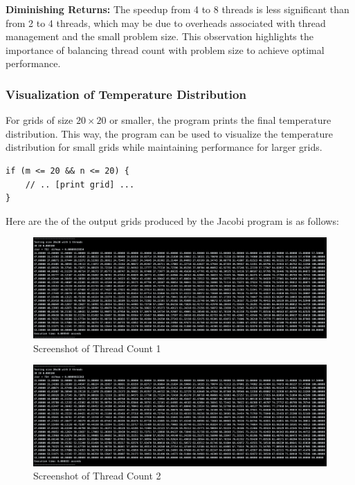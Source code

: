 \documentclass{article}
\begin{document}
\textbf{Diminishing Returns:} The speedup from 4 to 8 threads is less significant than from 2 to 4 threads, which may be due to overheads associated with thread management and the small problem size. This observation highlights the importance of balancing thread count with problem size to achieve optimal performance.

\subsubsection{Visualization of Temperature Distribution}

For grids of size $20\times20$ or smaller, the program prints the final temperature distribution. This way, the program can be used to visualize the temperature distribution for small grids while maintaining performance for larger grids.

\begin{lstlisting}[style=CStyle, caption={Conditional Printing of Grid Values}]
if (m <= 20 && n <= 20) {
    // .. [print grid] ...
}
\end{lstlisting}

Here are the of the output grids produced by the Jacobi program is as follows:

\begin{figure}[H]
    \centering
    \includegraphics[width=\linewidth]{Images/Thread1.png}
    \caption{Screenshot of Thread Count 1}
    \label{fig:thread1}
\end{figure}

\begin{figure}[H]
    \centering
    \includegraphics[width=\linewidth]{Images/Thread2.png}
    \caption{Screenshot of Thread Count 2}
    \label{fig:thread2}
\end{figure}
\end{document}
